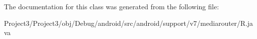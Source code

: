 The documentation for this class was generated from the following file\+:\begin{DoxyCompactItemize}
\item 
Project3/\+Project3/obj/\+Debug/android/src/android/support/v7/mediarouter/R.\+java\end{DoxyCompactItemize}
